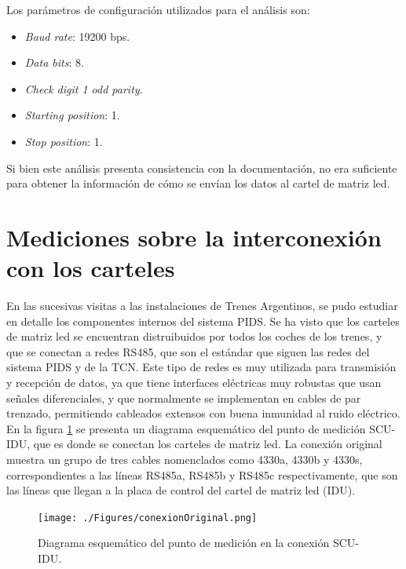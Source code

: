 Los parámetros de configuración utilizados para el análisis son:

\begin{itemize}
\item \textit{Baud rate}: 19200 bps.
\item \textit{Data bits}: 8.
\item \textit{Check digit 1 odd parity}.
\item \textit{Starting position}: 1.
\item \textit{Stop position}: 1.
\end{itemize}

Si bien este análisis presenta consistencia con la documentación, no era suficiente para obtener la información de cómo se envían los datos al cartel de matriz led. \\

\section{Mediciones sobre la interconexión con los carteles}

En las sucesivas visitas a las instalaciones de Trenes Argentinos, se pudo estudiar en detalle los componentes internos del sistema PIDS. Se ha visto que los carteles de matriz led se encuentran distruibuidos por todos los coches de los trenes, y que se conectan a redes RS485, que son el estándar que siguen las redes del sistema PIDS y de la TCN. Este tipo de redes es muy utilizada para transmisión y recepción de datos, ya que tiene interfaces eléctricas muy robustas que usan señales diferenciales, y que normalmente se implementan en cables de par trenzado, permitiendo cableados extensos con buena inmunidad al ruido eléctrico.  \\

En la figura \ref{fig:conexionOriginal} se presenta un diagrama esquemático del punto de medición SCU-IDU, que es donde se conectan los carteles de matriz led. La conexión original muestra un grupo de tres cables nomenclados como 4330a, 4330b y 4330s, correspondientes a las líneas RS485a, RS485b y RS485c respectivamente, que son las líneas que llegan a la placa de control del cartel de matriz led (IDU). \\

\begin{figure}[H]
	\centering
      \texttt{[image: ./Figures/conexionOriginal.png]}
	\caption{Diagrama esquemático del punto de medición en la conexión SCU-IDU.}
	\label{fig:conexionOriginal}
\end{figure}

